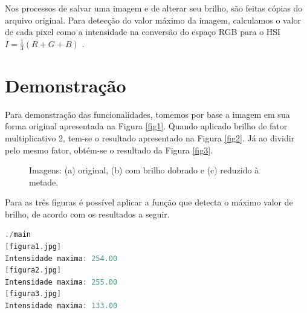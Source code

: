 \documentclass[a4paper, 10pt, conference]{ieeeconf}
\begin{document}
Nos processos de salvar uma imagem e de alterar seu brilho, são feitas cópias do arquivo original. Para detecção do valor máximo da imagem, calculamos o valor de cada pixel como a intensidade na conversão do espaço RGB para o HSI $I=\frac{1}{3}(R+G+B)$ \cite{rgb}.

\section{Demonstração}


Para demonstração das funcionalidades, tomemos por base a imagem em sua forma original apresentada na Figura \ref{fig1}. Quando aplicado brilho de fator multiplicativo 2, tem-se o resultado apresentado na Figura \ref{fig2}. Já ao dividir pelo mesmo fator, obtém-se o resultado da Figura \ref{fig3}.

\begin{figure}[h]
	\centering
	\hspace{0.05cm}
	\hspace{0.05cm}
	\caption{Imagens: (a) original, (b) com brilho dobrado e (c) reduzido à metade.}
	\label{comp}
\end{figure}

Para as três figuras é possível aplicar a função que detecta o máximo valor de brilho, de acordo com os resultados a seguir.
\newline
\newline
\newline
\begin{lstlisting}[language=C, basicstyle=\footnotesize, frame=single]
./main
[figura1.jpg]
Intensidade maxima: 254.00
[figura2.jpg]
Intensidade maxima: 255.00
[figura3.jpg]
Intensidade maxima: 133.00
\end{lstlisting}
\end{document}
